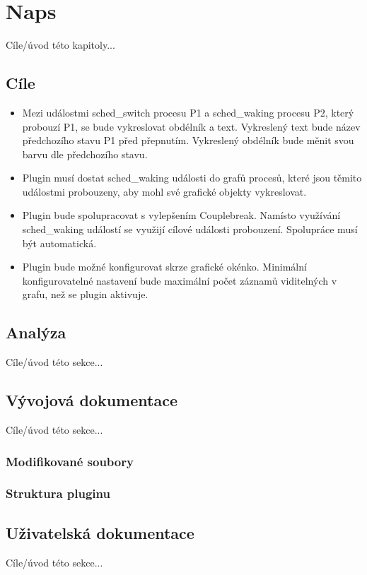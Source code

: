 \chapter{Naps}

Cíle/úvod této kapitoly...

\section{Cíle}

\begin{itemize}
    \item Mezi událostmi sched\_switch procesu P1 a sched\_waking procesu P2, který probouzí P1, se bude vykreslovat obdélník a text. Vykreslený text bude název předchozího stavu P1 před přepnutím. Vykreslený obdélník bude měnit svou barvu dle předchozího stavu.
    \item Plugin musí dostat sched\_waking události do grafů procesů, které jsou těmito událostmi probouzeny, aby mohl své grafické objekty vykreslovat.
    \item Plugin bude spolupracovat s vylepšením Couplebreak. Namísto využívání sched\_waking událostí se využijí cílové události probouzení. Spolupráce musí být automatická.
    \item Plugin bude možné konfigurovat skrze grafické okénko. Minimální konfigurovatelné nastavení bude maximální počet záznamů viditelných v grafu, než se plugin aktivuje. 
\end{itemize}


\section{Analýza}
Cíle/úvod této sekce...


\section{Vývojová dokumentace}
Cíle/úvod této sekce...

\subsection{Modifikované soubory}

\subsection{Struktura pluginu}

\section{Uživatelská dokumentace}
Cíle/úvod této sekce...

